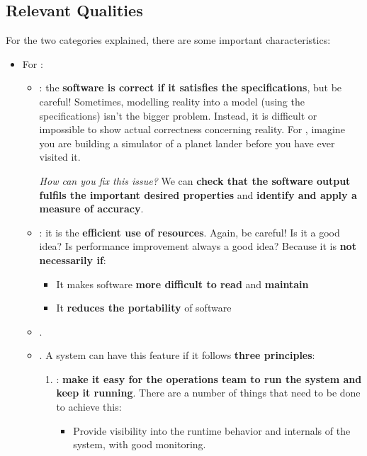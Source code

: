 \subsection{Relevant Qualities}

For the two categories explained, there are some important characteristics:
\begin{itemize}
    \item For :
    \begin{itemize}
        \item \underline{}: the \textbf{software is correct if it satisfies the specifications}, but be careful! Sometimes, modelling reality into a model (using the specifications) isn't the bigger problem. Instead, it is difficult or impossible to show actual correctness concerning reality. For , imagine you are building a simulator of a planet lander before you have ever visited it.
        
        \emph{How can you fix this issue?} We can \textbf{check that the software output fulfils the important desired properties} and \textbf{identify and apply a measure of accuracy}.

        
        \item \underline{}: it is the \textbf{efficient use of resources}. Again, be careful! Is it a good idea? Is performance improvement always a good idea? Because it is \textbf{not necessarily if}:
        \begin{itemize}
            \item It makes software \textbf{more difficult to read} and \textbf{maintain}
            \item It \textbf{reduces the portability} of software
        \end{itemize}
        
        
        \item \underline{}.
        
        
        \item \underline{}. A system can have this feature if it follows \textbf{three principles}:
        \begin{enumerate}
            \item {}: \textbf{make it easy for the operations team to run the system and keep it running}. There are a number of things that need to be done to achieve this:
            \begin{itemize}
                \item Provide visibility into the runtime behavior and internals of the system, with good monitoring.


\end{itemize}
\end{enumerate}
\end{itemize}
\end{itemize}
